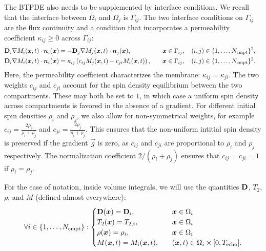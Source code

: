 \documentclass[a4paper]{article}
\begin{document}
The BTPDE also needs to be supplemented by interface conditions. We recall that the interface between $\Omega_i$ and $\Omega_j$ is $\Gamma_{i j}$. The two interface conditions on $\Gamma_{i j}$ are the flux continuity and a condition that incorporates a permeability coefficient $\kappa_{i j} \geq 0$ across $\Gamma_{i j}$:
\begin{alignat}{3}
    \mathbf{D}_i \nabla M_i(\bm{x}, t) \cdot \bm{n}_i(\bm{x}) & = -\mathbf{D}_j \nabla M_j(\bm{x}, t) \cdot \bm{n}_j(\bm{x}), \quad                  &  & \bm{x} \in \Gamma_{i j}, \quad (i, j) \in \{1, \dots, N_\text{cmpt}\}^2, & \\
    \mathbf{D}_i \nabla M_i(\bm{x}, t) \cdot \bm{n}_i(\bm{x}) & = \kappa_{i j} \left(c_{i j} M_j(\bm{x}, t) - c_{j i} M_i(\bm{x}, t)\right), \quad &  & \bm{x} \in \Gamma_{i j}, \quad (i, j) \in \{1, \dots, N_\text{cmpt}\}^2. &
\end{alignat}
Here, the permeability coefficient characterizes the membrane: $\kappa_{i j} = \kappa_{j i}$. The two weights $c_{i j}$ and $c_{j i}$ account for the spin density equilibrium between the two compartments. These may both be set to $1$, in which case a uniform spin density across compartments is favored in the absence of a gradient. For different initial spin densities $\rho_i$ and $\rho_j$, we also allow for non-symmetrical weights, for example\cite{Lee2021} $c_{i j} = \frac{2 \rho_i}{\rho_i + \rho_j}$ and $c_{j i} = \frac{2 \rho_j}{\rho_i + \rho_j}$. This ensures that the non-uniform intitial spin density is preserved if the gradient $\vec{g}$ is zero, as $c_{i j}$ and $c_{j i}$ are proportional to $\rho_i$ and $\rho_j$ respectively. The normalization coefficient $2 / (\rho_i + \rho_j)$ ensures that $c_{i j} = c_{j i} = 1$ if $\rho_i = \rho_j$.

For the ease of notation, inside volume integrals, we will use the quantities $\mathbf{D}$, $T_2$, $\rho$, and $M$ (defined almost everywhere):
\begin{equation}
    \forall i \in \{1, \dots, N_\text{cmpt}\} :
    \begin{cases}
        \mathbf{D}(\bm{x}) = \mathbf{D}_i, \quad    & \bm{x} \in \Omega_i                                 \\
        T_2(\bm{x}) = T_{2,i}, \quad          & \bm{x} \in \Omega_i                                 \\
        \rho(\bm{x}) = \rho_i, \quad          & \bm{x} \in \Omega_i                                 \\
        M(\bm{x}, t) = M_i(\bm{x}, t), \quad & (\bm{x}, t) \in \Omega_i \times [0, T_\text{echo}].
    \end{cases}
\end{equation}
\end{document}
